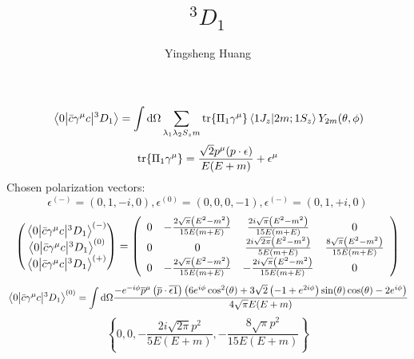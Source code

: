 \documentclass{article}
\title{$^3D_1$}
\author{Yingsheng Huang}
\newcommand{\gm}{\gamma^{\mu}}
\newcommand{\la}{\lambda}
\begin{document}
\maketitle
$$\mel{0}{\bar c\gm c}{^3D_1}=\int\dd\Omega\sum_{\la_1\la_2 S_zm}\tr{\Pi_1\gm}\braket{1J_z}{2m;1S_z}Y_{2m}(\theta,\phi)$$
$$\tr{\Pi_1\gm}=\frac{\sqrt{2}p^{\mu}(p\cdot\epsilon)}{E(E+m)}+\epsilon^{\mu}$$
Chosen polarization vectors: 
$$\epsilon^{(-)}=(0,1,-i,0),\epsilon^{(0)}=(0,0,0,-1),\epsilon^{(-)}=(0,1,+i,0)$$
$$\pmqty{\mel{0}{\bar c\gm c}{^3D_1}^{(-)}\\\mel{0}{\bar c\gm c}{^3D_1}^{(0)}\\\mel{0}{\bar c\gm c}{^3D_1}^{(+)}}=\left(
\begin{array}{cccc}
 0 & -\frac{2 \sqrt{\pi } \left(E^2-m^2\right)}{15 E (m+E)} & \frac{2 i \sqrt{\pi } \left(E^2-m^2\right)}{15 E (m+E)} & 0 \\
 0 & 0 & \frac{2 i \sqrt{2 \pi } \left(E^2-m^2\right)}{5 E (m+E)} & \frac{8 \sqrt{\pi } \left(E^2-m^2\right)}{15 E (m+E)} \\
 0 & -\frac{2 \sqrt{\pi } \left(E^2-m^2\right)}{15 E (m+E)} & -\frac{2 i \sqrt{\pi } \left(E^2-m^2\right)}{15 E (m+E)} & 0 \\
\end{array}
\right)$$
$$\mel{0}{\bar c\gm c}{^3D_1}^{(0)}=\int\dd\Omega \frac{-e^{-i \phi } \overline{p}^{\mu } \left(\overline{p}\cdot
   \overline{\text{$\epsilon $1}}\right) \left(6 e^{i \phi } \cos ^2(\theta )+3
   \sqrt{2} \left(-1+e^{2 i \phi }\right) \sin (\theta ) \cos (\theta )-2 e^{i \phi
   }\right)}{4 \sqrt{\pi } E (E+m)}$$
$$\left\{0,0,-\frac{2 i \sqrt{2 \pi } p^2}{5 E (E+m)},-\frac{8 \sqrt{\pi } p^2}{15 E (E+m)}\right\}$$
\end{document}
